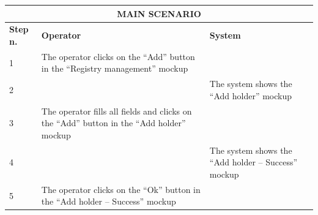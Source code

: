 {{{\begin{center}
			\begin{tabular}{|p{2cm}|p{6cm}|p{6cm}|}
			\hline
				\multicolumn{3}{|c|}{MAIN SCENARIO}\\
			\hline
				\centering \vspace{1mm} \bfseries{Step n.} \vspace{1mm} & \vspace{1mm} \bfseries{Operator} \vspace{1mm} & 
				\vspace{1mm} \bfseries{System} \vspace{1mm}\\
			\hline
				\vspace{1mm} 1 \vspace{1mm} &
				\vspace{1mm} The operator clicks on the “Add” button in the “Registry management” mockup \vspace{1mm} & 
				\vspace{1mm} \vspace{1mm} \\
			\hline
				\vspace{1mm} 2 \vspace{1mm} &
				\vspace{1mm} \vspace{1mm} & 
				\vspace{1mm} The system shows the “Add holder” mockup \vspace{1mm} \\
			\hline
				\vspace{1mm} 3 \vspace{1mm} &
				\vspace{1mm} The operator fills all fields and clicks on the “Add” button in the “Add holder” mockup \vspace{1mm} & 
				\vspace{1mm} \vspace{1mm} \\
			\hline
				\vspace{1mm} 4 \vspace{1mm} &
				\vspace{1mm} \vspace{1mm} & 
				\vspace{1mm} The system shows the “Add holder – Success”  mockup \vspace{1mm} \\
			\hline
				\vspace{1mm} 5 \vspace{1mm} &
				\vspace{1mm} The operator clicks on the “Ok” button in the “Add holder – Success”  mockup \vspace{1mm} & 

\end{tabular}
\end{center}}}}
